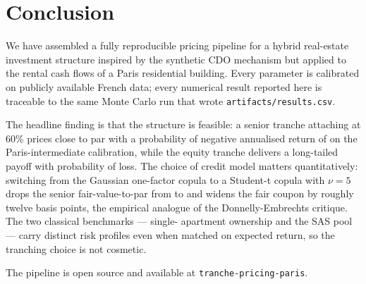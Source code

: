 \section{Conclusion}\label{sec:conclusion}

We have assembled a fully reproducible pricing pipeline for a hybrid
real-estate investment structure inspired by the synthetic CDO mechanism
but applied to the rental cash flows of a Paris residential building.
Every parameter is calibrated on publicly available French data; every
numerical result reported here is traceable to the same Monte Carlo run
that wrote \texttt{artifacts/results.csv}.

The headline finding is that the structure is feasible: a senior tranche
attaching at 60\% prices close to par with a probability of negative
annualised return of \probNegSenior{} on the Paris-intermediate
calibration, while the equity tranche delivers a long-tailed payoff with
\probNegEquity{} probability of loss. The choice of credit model matters
quantitatively: switching from the Gaussian one-factor copula to a
Student-t copula with $\nu = 5$ drops the senior fair-value-to-par from
\seniorFairGauss{} to \seniorFairStudent{} and widens the fair coupon by
roughly twelve basis points, the empirical analogue of the
Donnelly-Embrechts critique. The two classical benchmarks --- single-
apartment ownership and the SAS pool --- carry distinct risk profiles
even when matched on expected return, so the tranching choice is not
cosmetic.

The pipeline is open source and available at
\texttt{tranche-pricing-paris}.
